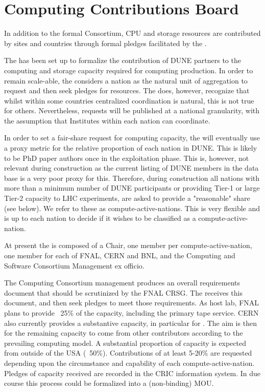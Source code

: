 \documentclass[../main-v1.tex]{subfiles}
\begin{document}
\section{Computing Contributions Board }\label{sec:ccb}

In addition to the formal Consortium, CPU and storage resources are contributed by sites and countries through formal pledges facilitated by the . 

The  has been set up to formalize the contribution of DUNE partners to the computing and storage capacity required for computing production. In order to remain scale-able, the  considers a nation as the natural unit of aggregation to request and then seek pledges for resources. The  does, however, recognize that whilst within some countries centralized coordination is natural, this is not true for others. Nevertheless, requests will be published at a national granularity, with the assumption that Institutes within each nation can coordinate.

In order to set a fair-share request for computing capacity, the  will eventually use a proxy metric for the relative proportion of each nation in DUNE. This is likely to be PhD paper authors once in the exploitation phase. This is, however, not relevant during construction as the current listing of DUNE members in the data base is a very poor proxy for this. Therefore, during construction all nations with more than a minimum number of DUNE participants or providing Tier-1 or large Tier-2 capacity to LHC experiments, are asked to provide a "reasonable" share (see below). We refer to these as compute-active-nations.
This is very flexible and is up to each nation to decide if it wishes to be classified as a compute-active-nation.

At present the  is composed of a Chair, one member per compute-active-nation, one member for each of FNAL, CERN and BNL, and the Computing and Software Consortium  Management ex officio.

The Computing Consortium management produces an overall requirements document that should be scrutinized by the FNAL CRSG. The  receives this document, and then seek pledges to meet those requirements. As host lab, FNAL plans to provide ~25\% of the capacity, including the primary tape service.
CERN also currently provides a substantive capacity, in particular for .
The aim is then for the remaining capacity to come from other contributors according to the prevailing computing model. A substantial proportion of capacity is expected from outside of the USA  (~50\%). Contributions of at least 5-20\% are requested depending upon the circumstance and capability of each compute-active-nation.
Pledges of capacity received are recorded in the CRIC information system. In due course this process could be formalized into a (non-binding) MOU.
\end{document}
